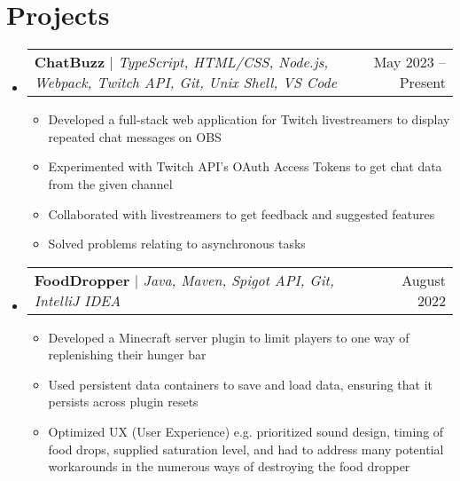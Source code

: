 \documentclass[letterpaper,11pt]{article}
\makeatletter
\newcommand{\resumeItem}[1]{
  \item\small{
    {#1 \vspace{-2pt}}
  }
}
\newcommand{\resumeProjectHeading}[2]{
    \item
    \begin{tabular*}{0.97\textwidth}{l@{\extracolsep{\fill}}r}
      \small#1 & #2 \\
    \end{tabular*}\vspace{-7pt}
}
\newcommand{\resumeSubHeadingListStart}{\begin{itemize}[leftmargin=0.15in, label={}]}
\newcommand{\resumeSubHeadingListEnd}{\end{itemize}}
\newcommand{\resumeItemListStart}{\begin{itemize}}
\newcommand{\resumeItemListEnd}{\end{itemize}\vspace{-5pt}}
\makeatother
\begin{document}
\section{Projects}
\resumeSubHeadingListStart

\resumeProjectHeading
{\textbf{ChatBuzz} $|$ \footnotesize\emph{TypeScript, HTML/CSS, Node.js, Webpack, Twitch API, Git, Unix Shell, VS Code}}{May 2023 -- Present}
\resumeItemListStart
\resumeItem{Developed a full-stack web application for Twitch livestreamers to display repeated chat messages on OBS}
\resumeItem{Experimented with Twitch API's OAuth Access Tokens to get chat data from the given channel}
\resumeItem{Collaborated with livestreamers to get feedback and suggested features}
\resumeItem{Solved problems relating to asynchronous tasks}
\resumeItemListEnd

\resumeProjectHeading
{\textbf{FoodDropper} $|$ \footnotesize\emph{Java, Maven, Spigot API, Git, IntelliJ IDEA}}{August 2022}
\resumeItemListStart
\resumeItem{Developed a Minecraft server plugin to limit players to one way of replenishing their hunger bar}
\resumeItem{Used persistent data containers to save and load data, ensuring that it persists across plugin resets}
\resumeItem{Optimized UX (User Experience) e.g. prioritized sound design, timing of food drops, supplied saturation level, and had to address many potential workarounds in the numerous ways of destroying the food dropper}
\resumeItemListEnd

\resumeSubHeadingListEnd
\end{document}
